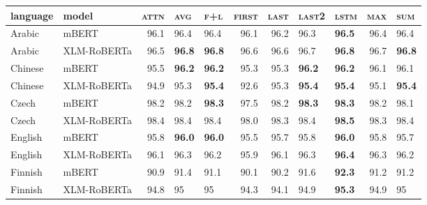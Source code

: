 \begin{tabular}{llrllrrllrl}
\toprule
\textbf{language} & \textbf{model} &  \textsc{attn} & \textsc{avg} & \textsc{f+l} &  \textsc{first} &  \textsc{last} & \textsc{last2} & \textsc{lstm} &  \textsc{max} & \textsc{sum} \\
\midrule
           Arabic &          mBERT &           96.1 &         96.4 &         96.4 &            96.1 &           96.2 &           96.3 &    \textbf{96.5} &          96.4 &         96.4 \\
           Arabic &    XLM-RoBERTa &           96.5 &   \textbf{96.8} &   \textbf{96.8} &            96.6 &           96.6 &           96.7 &    \textbf{96.8} &          96.7 &   \textbf{96.8} \\
          Chinese &          mBERT &           95.5 &   \textbf{96.2} &   \textbf{96.2} &            95.3 &           95.3 &     \textbf{96.2} &    \textbf{96.2} &          96.1 &         96.1 \\
          Chinese &    XLM-RoBERTa &           94.9 &         95.3 &   \textbf{95.4} &            92.6 &           95.3 &     \textbf{95.4} &    \textbf{95.4} &          95.1 &   \textbf{95.4} \\
            Czech &          mBERT &           98.2 &         98.2 &   \textbf{98.3} &            97.5 &           98.2 &     \textbf{98.3} &    \textbf{98.3} &          98.2 &         98.1 \\
            Czech &    XLM-RoBERTa &           98.4 &         98.4 &         98.4 &            98.0 &           98.3 &           98.4 &    \textbf{98.5} &          98.3 &         98.4 \\
          English &          mBERT &           95.8 &   \textbf{96.0} &   \textbf{96.0} &            95.5 &           95.7 &           95.8 &    \textbf{96.0} &          95.8 &         95.7 \\
          English &    XLM-RoBERTa &           96.1 &         96.3 &         96.2 &            95.9 &           96.1 &           96.3 &    \textbf{96.4} &          96.3 &         96.2 \\
          Finnish &          mBERT &           90.9 &         91.4 &         91.1 &            90.1 &           90.2 &           91.6 &    \textbf{92.3} &          91.2 &         91.2 \\
          Finnish &    XLM-RoBERTa &           94.8 &           95 &           95 &            94.3 &           94.1 &           94.9 &    \textbf{95.3} &          94.9 &           95 \\

\end{tabular}
